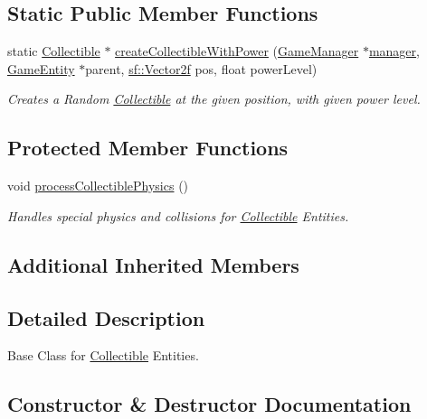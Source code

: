 \subsection*{Static Public Member Functions}
\begin{DoxyCompactItemize}
\item 
static \mbox{\hyperlink{class_collectible}{Collectible}} $\ast$ \mbox{\hyperlink{class_collectible_a0b1b2f929eee25c69826efbd3e91916c}{create\+Collectible\+With\+Power}} (\mbox{\hyperlink{class_game_manager}{Game\+Manager}} $\ast$\mbox{\hyperlink{class_game_entity_a1771f6e83f237a25fe370dd3a926cfb1}{manager}}, \mbox{\hyperlink{class_game_entity}{Game\+Entity}} $\ast$parent, \mbox{\hyperlink{classsf_1_1_vector2}{sf\+::\+Vector2f}} pos, float power\+Level)
\begin{DoxyCompactList}\small\item\em Creates a Random \mbox{\hyperlink{class_collectible}{Collectible}} at the given position, with given power level. \end{DoxyCompactList}\end{DoxyCompactItemize}
\subsection*{Protected Member Functions}
\begin{DoxyCompactItemize}
\item 
\mbox{\label{class_collectible_a2b4ad7ec565c7575ae10a8e3c5d356f7}} 
void \mbox{\hyperlink{class_collectible_a2b4ad7ec565c7575ae10a8e3c5d356f7}{process\+Collectible\+Physics}} ()
\begin{DoxyCompactList}\small\item\em Handles special physics and collisions for \mbox{\hyperlink{class_collectible}{Collectible}} Entities. \end{DoxyCompactList}\end{DoxyCompactItemize}
\subsection*{Additional Inherited Members}


\subsection{Detailed Description}
Base Class for \mbox{\hyperlink{class_collectible}{Collectible}} Entities. 

\subsection{Constructor \& Destructor Documentation}
\mbox{\label{class_collectible_a932aefe3be93a008663fdca461498d18}} 
